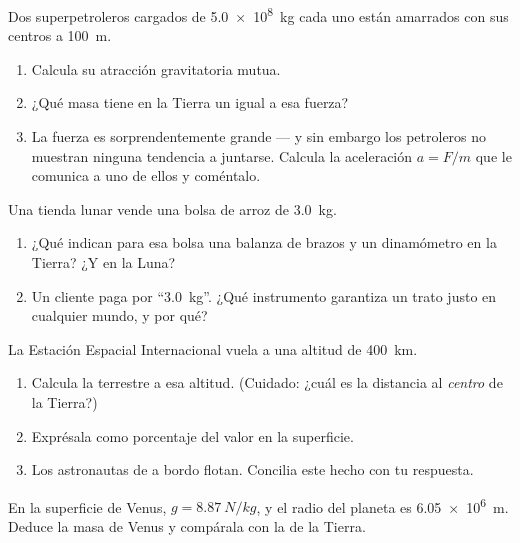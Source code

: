 \begin{exercise}[$\star\star$]\label{exo:g10:universal-gravitation:6}
Dos superpetroleros cargados de \qty{5.0e8}{kg} cada uno están amarrados
con sus centros a \qty{100}{m}.
\begin{enumerate}
  \item Calcula su atracción gravitatoria mutua.
  \item ¿Qué masa tiene en la Tierra un  igual a esa fuerza?
  \item La fuerza es sorprendentemente grande --- y sin embargo los
        petroleros no muestran ninguna tendencia a juntarse. Calcula la
        aceleración $a = F/m$ que le comunica a uno de ellos y coméntalo.
\end{enumerate}
\end{exercise}

\begin{exercise}[$\star\star$]\label{exo:g10:universal-gravitation:7}
Una tienda lunar vende una bolsa de arroz de \qty{3.0}{kg}.
\begin{enumerate}
  \item ¿Qué indican para esa bolsa una balanza de brazos y un
        dinamómetro en la Tierra? ¿Y en la Luna?
  \item Un cliente paga por ``\qty{3.0}{kg}''. ¿Qué instrumento
        garantiza un trato justo en cualquier mundo, y por qué?
\end{enumerate}
\end{exercise}

\begin{exercise}[$\star\star$]\label{exo:g10:universal-gravitation:8}
La Estación Espacial Internacional vuela a una altitud de \qty{400}{km}.
\begin{enumerate}
  \item Calcula la  terrestre a esa
        altitud. (Cuidado: ¿cuál es la distancia al \emph{centro} de la
        Tierra?)
  \item Exprésala como porcentaje del valor en la superficie.
  \item Los astronautas de a bordo flotan. Concilia este hecho con tu
        respuesta.
\end{enumerate}
\end{exercise}

\begin{exercise}[$\star\star$]\label{exo:g10:universal-gravitation:9}
En la superficie de Venus, $g = \qty{8.87}{N/kg}$, y el radio del
planeta es \qty{6.05e6}{m}. Deduce la masa de Venus y compárala con la
de la Tierra.
\end{exercise}

